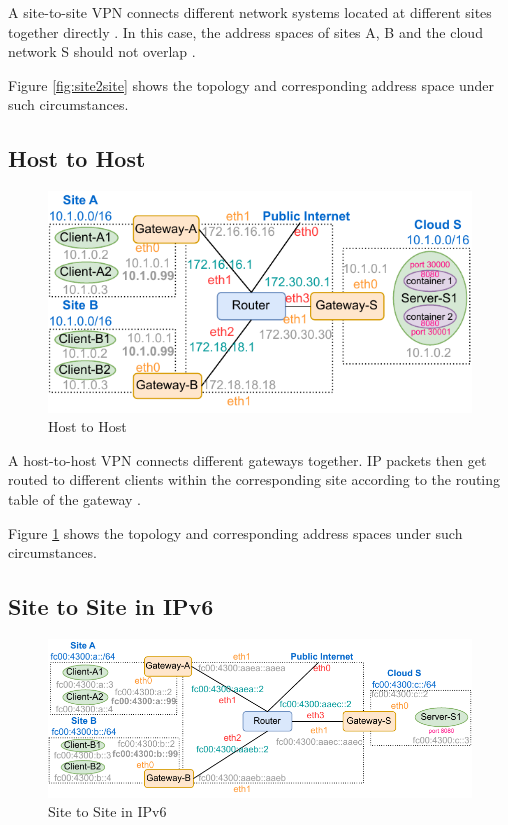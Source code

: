 \documentclass[article]{aaltoseries}
\begin{document}
A site-to-site VPN connects different network systems located at different sites together directly \cite{9022848}. In this case, the address spaces of sites A, B and the cloud network S should not overlap \cite{AKYILDIZ2023100695}.

Figure \ref{fig:site2site} shows the topology and corresponding address space under such circumstances.

\subsection{Host to Host}
\begin{figure}[t!]
  \begin{center}
    \includegraphics[width=1.1\textwidth]{figures/host-to-host.pdf}
    \caption{Host to Host}
    \label{fig:host2host}
  \end{center}
\end{figure}

A host-to-host VPN connects different gateways together. IP packets then get routed to different clients within the corresponding site according to the routing table of the gateway \cite{dulany2006performance}.

Figure \ref{fig:host2host} shows the topology and corresponding address spaces under such circumstances.

\subsection{Site to Site in IPv6}
\begin{figure}[t!]
  \begin{center}
    \includegraphics{figures/ipv6-site-to-site.pdf}
    \caption{Site to Site in IPv6}
    \label{fig:ipv6site2site}
  \end{center}
\end{figure}
\end{document}
